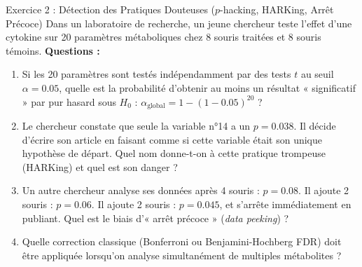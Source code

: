 \documentclass[11pt,a4paper]{article}
\begin{document}
\begin{exercicebox}{Exercice 2 : Détection des Pratiques Douteuses ($p$-hacking, HARKing, Arrêt Précoce)}
Dans un laboratoire de recherche, un jeune chercheur teste l'effet d'une cytokine sur 20 paramètres métaboliques chez 8 souris traitées et 8 souris témoins.
\textbf{Questions :}
\begin{enumerate}[label=\textbf{\alph*.}]
  \item Si les 20 paramètres sont testés indépendamment par des tests $t$ au seuil $\alpha = 0.05$, quelle est la probabilité d'obtenir au moins un résultat « significatif » par pur hasard sous $H_0$ : $\alpha_{\text{global}} = 1 - (1 - 0.05)^{20}$ ?
  \item Le chercheur constate que seule la variable n°14 a un $p = 0.038$. Il décide d'écrire son article en faisant comme si cette variable était son unique hypothèse de départ. Quel nom donne-t-on à cette pratique trompeuse (HARKing) et quel est son danger ?
  \item Un autre chercheur analyse ses données après 4 souris : $p = 0.08$. Il ajoute 2 souris : $p = 0.06$. Il ajoute 2 souris : $p = 0.045$, et s'arrête immédiatement en publiant. Quel est le biais d'« arrêt précoce » (\textit{data peeking}) ?
  \item Quelle correction classique (Bonferroni ou Benjamini-Hochberg FDR) doit être appliquée lorsqu'on analyse simultanément de multiples métabolites ?
\end{enumerate}
\end{exercicebox}
\end{document}
